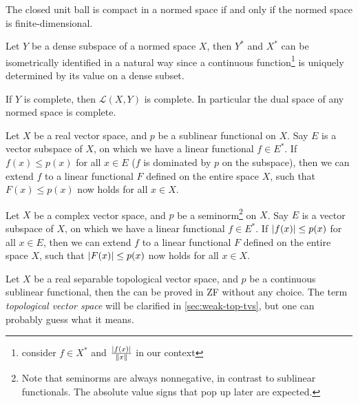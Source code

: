 \begin{thm}
    The closed unit ball is compact in a normed space if and only if the normed space is finite-dimensional.
\end{thm}

\begin{fact}
    Let $Y$ be a dense subspace of a normed space $X$, then $Y^*$ and $X^*$ can be isometrically identified in a natural way since a continuous function\footnote{consider $f\in X^*$ and $\frac{\lvert f(x) \rvert}{\lVert x \rVert}$ in our context} is uniquely determined by its value on a dense subset.
\end{fact}

\begin{prop}
    If $Y$ is complete, then $\mathcal{L}(X,Y)$ is complete. In particular the dual space of any normed space is complete.
\end{prop}

\begin{namedthm} \label{thm:hahn-banach}
    Let $X$ be a real vector space, and $p$ be a sublinear functional on $X$. Say $E$ is a vector subspace of $X$, on which we have a linear functional $f\in E^*$. If $f(x)\leq p(x)$ for all $x\in E$ ($f$ is dominated by $p$ on the subspace), then we can extend $f$ to a linear functional $F$ defined on the entire space $X$, such that $F(x)\leq p(x)$ now holds for all $x \in X$.

    Let $X$ be a complex vector space, and $p$ be a seminorm\footnote{Note that seminorms are always nonnegative, in contrast to sublinear functionals. The absolute value signs that pop up later are expected.} on $X$. Say $E$ is a vector subspace of $X$, on which we have a linear functional $f\in E^*$. If $\lvert f(x) \rvert\leq p(x)$ for all $x\in E$, then we can extend $f$ to a linear functional $F$ defined on the entire space $X$, such that $\lvert F(x) \rvert\leq p(x)$ now holds for all $x \in X$.
\end{namedthm}

    Let $X$ be a real separable topological vector space, and $p$ be a continuous sublinear functional, then the  can be proved in \textsf{ZF} without any choice. The term \emph{topological vector space} will be clarified in \cref{sec:weak-top-tvs}, but one can probably guess what it means.

